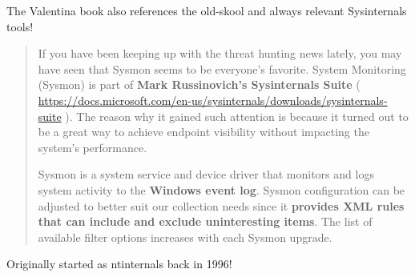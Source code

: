 \documentclass[Screen16to9,17pt]{foils}
\begin{document}
The Valentina book also references the old-skool and always relevant Sysinternals tools!
\begin{quote}
If you have been keeping up with the threat hunting news lately, you may have seen that Sysmon seems to be everyone's favorite. System Monitoring (Sysmon) is part of {\bf Mark Russinovich's Sysinternals Suite} ( \url{https://docs.microsoft.com/en-us/sysinternals/downloads/sysinternals-suite} ). The reason why it gained such attention is because it turned out to be a great way to achieve endpoint visibility without impacting the system's performance.

Sysmon is a system service and device driver that monitors and logs system activity to
the {\bf Windows event log}. Sysmon configuration can be adjusted to better suit our collection
needs since it {\bf provides XML rules that can include and exclude uninteresting items}. The
list of available filter options increases with each Sysmon upgrade.
\end{quote}

\begin{list2}
\item Originally started as ntinternals back in 1996!
\end{list2}


\end{document}
